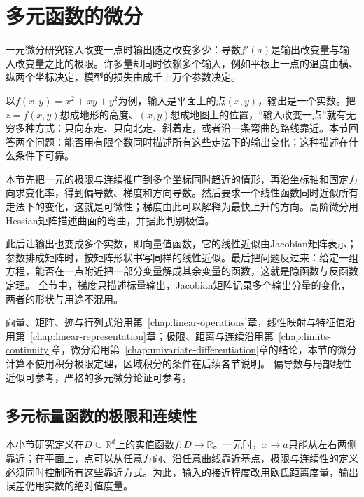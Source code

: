 \par{}
\section{多元函数的微分}
\label{sec:analysis-multivariable-differentiation}
\label{sec:multivariable-differentiation}

一元微分研究输入改变一点时输出随之改变多少：导数$f'(a)$是输出改变量与输入改变量之比的极限。许多量却同时依赖多个输入，例如平板上一点的温度由横、纵两个坐标决定，模型的损失由成千上万个参数决定。

以$f(x,y)=x^2+xy+y^2$为例，输入是平面上的点$(x,y)$，输出是一个实数。把$z=f(x,y)$想成地形的高度、$(x,y)$想成地图上的位置，“输入改变一点”就有无穷多种方式：只向东走、只向北走、斜着走，或者沿一条弯曲的路线靠近。本节回答两个问题：能否用有限个数同时描述所有这些走法下的输出变化；这种描述在什么条件下可靠。

本节先把一元的极限与连续推广到多个坐标同时趋近的情形，再沿坐标轴和固定方向求变化率，得到偏导数、梯度和方向导数。然后要求一个线性函数同时近似所有走法下的变化，这就是可微性；梯度由此可以解释为最快上升的方向。高阶微分用Hessian矩阵描述曲面的弯曲，并据此判别极值。

此后让输出也变成多个实数，即向量值函数，它的线性近似由Jacobian矩阵表示；参数排成矩阵时，按矩阵形状书写同样的线性近似。最后把问题反过来：给定一组方程，能否在一点附近把一部分变量解成其余变量的函数，这就是隐函数与反函数定理。
全节中，梯度只描述标量输出，Jacobian矩阵记录多个输出分量的变化，两者的形状与用途不混用。

向量、矩阵、迹与行列式沿用第~\ref{chap:linear-operations}章，线性映射与特征值沿用第~\ref{chap:linear-representation}章；极限、距离与连续沿用第~\ref{chap:limits-continuity}章，微分沿用第~\ref{chap:univariate-differentiation}章的结论，本节的微分计算不使用积分极限定理，区域积分的条件在后续各节说明。
偏导数与局部线性近似可参考，严格的多元微分论证可参考。

\subsection{多元标量函数的极限和连续性}
\label{sec:multivariable-limits-continuity}

本小节研究定义在$D\subseteq\mathbb R^d$上的实值函数$f:D\to\mathbb R$。一元时，$x\to a$只能从左右两侧靠近；在平面上，点可以从任意方向、沿任意曲线靠近基点，极限与连续性的定义必须同时控制所有这些靠近方式。为此，输入的接近程度改用欧氏距离度量，输出误差仍用实数的绝对值度量。


